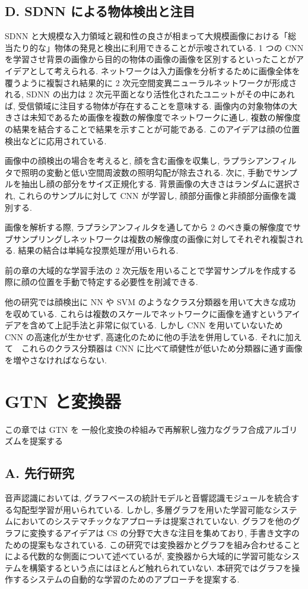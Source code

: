 \documentclass[twocolumn]{jarticle}     %
\begin{document}
\subsection*{D. SDNN による物体検出と注目}
SDNN と大規模な入力領域と親和性の良さが相まって大規模画像における「総当たり的な」物体の発見と検出に利用できることが示唆されている.
1 つの CNN を学習させ背景の画像から目的の物体の画像の画像を区別するといったことがアイデアとして考えられる. 
ネットワークは入力画像を分析するために画像全体を覆うように複製され結果的に 2 次元空間変異ニューラルネットワークが形成される, SDNN の出力は 2 次元平面となり活性化されたユニットがその中にあれば, 受信領域に注目する物体が存在することを意味する. 画像内の対象物体の大きさは未知であるため画像を複数の解像度でネットワークに通し, 複数の解像度の結果を結合することで結果を示すことが可能である. このアイデアは顔の位置検出などに応用されている.\par
画像中の顔検出の場合を考えると, 顔を含む画像を収集し, ラプラシアンフィルタで照明の変動と低い空間周波数の照明勾配が除去される. 次に, 手動でサンプルを抽出し顔の部分をサイズ正規化する. 背景画像の大きさはランダムに選択され, これらのサンプルに対して CNN が学習し, 顔部分画像と非顔部分画像を識別する.\par
画像を解析する際, ラプラシアンフィルタを通してから 2 のべき乗の解像度でサブサンプリングしネットワークは複数の解像度の画像に対してそれぞれ複製される. 結果の結合は単純な投票処理が用いられる. 
\par
前の章の大域的な学習手法の 2 次元版を用いることで学習サンプルを作成する際に顔の位置を手動で特定する必要性を削減できる.
\par
他の研究では顔検出に NN や SVM のようなクラス分類器を用いて大きな成功を収めている. これらは複数のスケールでネットワークに画像を通すというアイデアを含めて上記手法と非常に似ている. しかし CNN を用いていないため CNN の高速化が生かせず, 高速化のために他の手法を併用している. それに加えて　これらのクラス分類器は CNN に比べて頑健性が低いため分類器に通す画像を増やさなければならない. 

\section{GTN と変換器}
この章では GTN を 一般化変換の枠組みで再解釈し強力なグラフ合成アルゴリズムを提案する

\subsection*{A. 先行研究}
音声認識においては, グラフベースの統計モデルと音響認識モジュールを統合する勾配型学習が用いられている.
しかし, 多層グラフを用いた学習可能なシステムにおいてのシステマチックなアプローチは提案されていない. 
グラフを他のグラフに変換するアイデアは CS の分野で大きな注目を集めており, 手書き文字のための提案もなされている. この研究では変換器かとグラフを組み合わせることによる代数的な側面について述べているが, 変換器から大域的に学習可能なシステムを構築するという点にはほとんど触れられていない. 
本研究ではグラフを操作するシステムの自動的な学習のためのアプローチを提案する.
\end{document}
